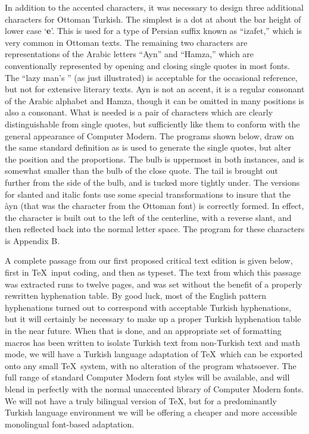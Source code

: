 In addition to the accented characters, it was necessary to design
three additional characters for Ottoman Turkish.  The simplest is
a dot at about the bar height of lower case `{\bf e}'.  This is
used for a type of Persian suffix known as ``izafet,'' which is
very common in Ottoman texts.  The remaining two characters are
representations of the Arabic letters ``Ayn'' and ``Hamza,'' which
are conventionally represented by opening and closing single
quotes in most fonts.  The ``lazy man's '' (as just
illustrated) is acceptable for the occasional reference, but not
for extensive literary texts.  Ayn is not an accent, it is a
regular consonant of the Arabic alphabet and Hamza, though it can
be omitted in many positions is also a consonant.  What is needed
is a pair of characters which are clearly distinguishable from
single quotes, but sufficiently like them to conform with the
general appearance of Computer Modern.  The programs shown below,
draw on the same standard definition as is used to generate the
single quotes, but alter the position and the proportions.  The
bulb is uppermost in both instances, and is somewhat smaller than
the bulb of the close quote.  The tail is brought out further from
the side of the bulb, and is tucked more tightly under.  The
versions for slanted and italic fonts use some special
transformations to insure that the {\tenti \`ayn} (that was the
character from the Ottoman font) is correctly formed.  In
effect, the character is built out to the left of the centerline,
with a reverse slant, and then reflected back into the normal letter space.
The program for these characters is Appendix B.

A complete passage from our first proposed critical text edition is
given below, first in \TeX\ input coding, and then as typeset.  The
text from which this passage was extracted runs to twelve pages, and
was set without the benefit of a properly rewritten hyphenation table.
By good luck, most of the English pattern hyphenations turned out to
correspond with acceptable Turkish hyphenations, but it will certainly
be necessary to make up a proper Turkish hyphenation table in the near
future.  When that is done, and an appropriate set of formatting
macros has been written to isolate Turkish text from non-Turkish text
and math mode, we will have a Turkish language adaptation of \TeX\
which can be exported onto any small \TeX\ system, with no alteration
of the program whatsoever.  The full range of standard Computer Modern
font styles will be available, and will blend in perfectly with the
normal unaccented library of Computer Modern fonts.  We will not have
a truly bilingual version of \TeX, but for a predominantly Turkish
language environment we will be offering a cheaper and more accessible
monolingual font-based adaptation.

